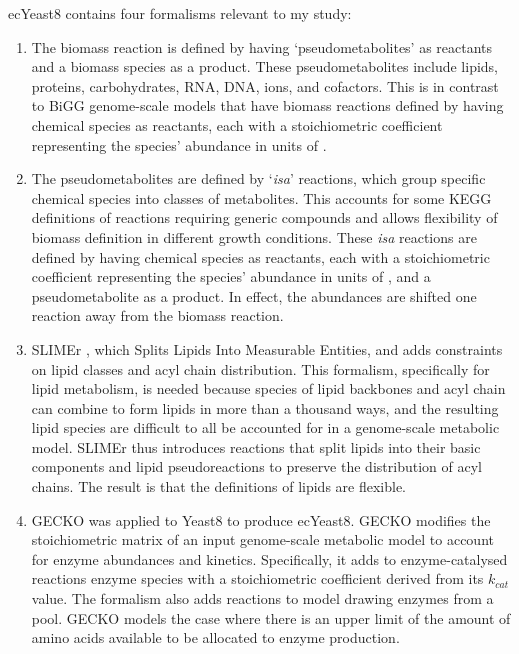ecYeast8 contains four formalisms relevant to my study:
\begin{enumerate}
  \item
        The biomass reaction is defined by having `pseudometabolites' as reactants and a biomass species as a product.
        These pseudometabolites include lipids, proteins, carbohydrates, RNA, DNA, ions, and cofactors.
        This is in contrast to BiGG genome-scale models that have biomass reactions defined by having chemical species as reactants, each with a stoichiometric coefficient representing the species' abundance in units of \SI{}{\mmolgdw}.
  \item
        The pseudometabolites are defined by `\textit{isa}' reactions, which group specific chemical species into classes of metabolites.
        This accounts for some KEGG definitions of reactions requiring generic compounds and allows flexibility of biomass definition in different growth conditions.
        These \textit{isa} reactions are defined by having chemical species as reactants, each with a stoichiometric coefficient representing the species' abundance in units of \SI{}{\mmolgdw}, and a pseudometabolite as a product.
        In effect, the abundances are shifted one reaction away from the biomass reaction.
  \item
        SLIMEr \parencite{sanchezSLIMErProbingFlexibility2019}, which Splits Lipids Into Measurable Entities, and adds constraints on lipid classes and acyl chain distribution.
        This formalism, specifically for lipid metabolism, is needed because species of lipid backbones and acyl chain can combine to form lipids in more than a thousand ways, and the resulting lipid species are difficult to all be accounted for in a genome-scale metabolic model.
        SLIMEr thus introduces reactions that split lipids into their basic components and lipid pseudoreactions to preserve the distribution of acyl chains.
        The result is that the definitions of lipids are flexible.
  \item
        GECKO was applied to Yeast8 to produce ecYeast8.  GECKO modifies the stoichiometric matrix of an input genome-scale metabolic model to account for enzyme abundances and kinetics.
        Specifically, it adds to enzyme-catalysed reactions enzyme species with a stoichiometric coefficient derived from its $k_{cat}$ value.
        The formalism also adds reactions to model drawing enzymes from a pool.  GECKO models the case where there is an upper limit of the amount of amino acids available to be allocated to enzyme production.
\end{enumerate}

